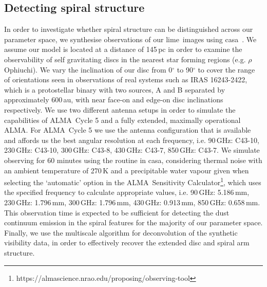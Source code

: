 \documentclass[fleqn,usenatbib]{mnras}
\newcommand{\lime}{{\sc lime}}
\newcommand{\casa}{{\sc casa}}
\newcommand{\alma}{ALMA}
\begin{document}
\subsection{Detecting spiral structure}

In order to investigate whether spiral structure can be distinguished across our parameter space, we synthesise observations of our \lime\ images using \casa\  \citep[v4.5.0;][]{McMullin&Waters2007}. We assume our model is located at a distance of 145\,pc in order to examine the observability of self gravitating discs in the nearest star forming regions (e.g. $\rho$ Ophiuchi). We vary the inclination of our disc from 0$^{\circ}$ to 90$^{\circ}$ to cover the range of orientations seen in observations of real systems such as IRAS 16243-2422, which is a protostellar binary with two sources, A and B separated by approximately 600\,au, with near face-on and edge-on disc inclinations respectively. We use two different antenna setups in order to simulate the capabilities of \alma\ Cycle 5 and a fully extended, maximally operational \alma. For \alma\ Cycle 5 we use the antenna configuration that is available and affords us the best angular resolution at each frequency, i.e. 90\,GHz: C43-10, 230\,GHz: C43-10, 300\,GHz: C43-8, 430\,GHz: C43-7, 850\,GHz: C43-7. We simulate observing for 60 minutes using the {} routine in \casa, considering thermal noise with an ambient temperature of 270\,K and a precipitable water vapour given when selecting the `automatic' option in the \alma\ Sensitivity Calculator\footnote{https://almascience.nrao.edu/proposing/observing-tool}, which uses the specified frequency to calculate appropriate values, i.e. 90\,GHz: 5.186\,mm, 230\,GHz: 1.796\,mm, 300\,GHz: 1.796\,mm, 430\,GHz: 0.913\,mm, 850\,GHz: 0.658\,mm. This observation time is expected to be sufficient for detecting the dust continuum emission in the spiral features for the majority of our parameter space. Finally, we use the multiscale {} algorithm for deconvolution of the synthetic visibility data, in order to effectively recover the extended disc and spiral arm structure.

\smallskip
\end{document}
